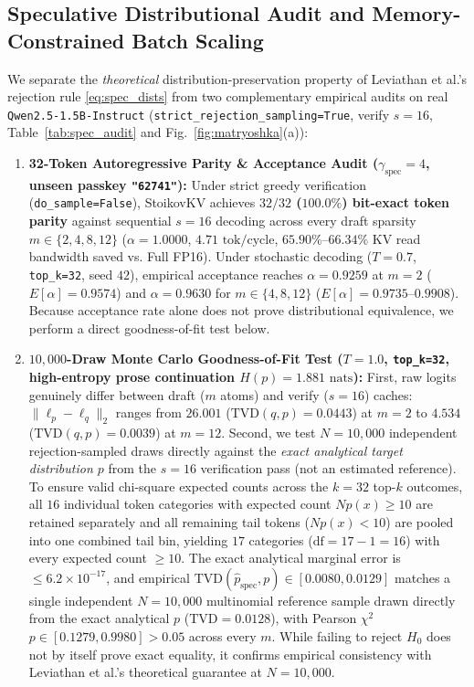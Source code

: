 \documentclass[conference]{IEEEtran}
\begin{document}
\subsection{Speculative Distributional Audit and Memory-Constrained Batch Scaling}
We separate the \emph{theoretical} distribution-preservation property of Leviathan et al.'s rejection rule \eqref{eq:spec_dists} from two complementary empirical audits on real \texttt{Qwen2.5-1.5B-Instruct} (\texttt{strict\_rejection\_sampling=True}, verify $s = 16$, Table~\ref{tab:spec_audit} and Fig.~\ref{fig:matryoshka}(a)):
\begin{enumerate}
    \item \textbf{32-Token Autoregressive Parity \& Acceptance Audit ($\gamma_{\text{spec}} = 4$, unseen passkey \texttt{"62741"}):} Under strict greedy verification (\texttt{do\_sample=False}), StoikovKV achieves \textbf{$32/32$ ($100.0\%$) bit-exact token parity} against sequential $s = 16$ decoding across every draft sparsity $m \in \{2, 4, 8, 12\}$ ($\alpha = 1.0000$, $4.71\text{ tok/cycle}$, $65.90\%$--$66.34\%$ KV read bandwidth saved vs. Full FP16). Under stochastic decoding ($T = 0.7$, \texttt{top\_k=32}, seed $42$), empirical acceptance reaches $\alpha = 0.9259$ at $m=2$ ($E[\alpha] = 0.9574$) and $\alpha = 0.9630$ for $m \in \{4, 8, 12\}$ ($E[\alpha] = 0.9735$--$0.9908$). Because acceptance rate alone does not prove distributional equivalence, we perform a direct goodness-of-fit test below.
    \item \textbf{$10{,}000$-Draw Monte Carlo Goodness-of-Fit Test ($T = 1.0$, \texttt{top\_k=32}, high-entropy prose continuation $H(p) = 1.881\text{ nats}$):} First, raw logits genuinely differ between draft ($m$ atoms) and verify ($s=16$) caches: $\|\ell_p - \ell_q\|_2$ ranges from $26.001$ ($\text{TVD}(q, p) = 0.0443$) at $m=2$ to $4.534$ ($\text{TVD}(q, p) = 0.0039$) at $m=12$. Second, we test $N = 10{,}000$ independent rejection-sampled draws directly against the \emph{exact analytical target distribution $p$} from the $s=16$ verification pass (not an estimated reference). To ensure valid chi-square expected counts across the $k = 32$ top-$k$ outcomes, all $16$ individual token categories with expected count $N p(x) \ge 10$ are retained separately and all remaining tail tokens ($N p(x) < 10$) are pooled into one combined tail bin, yielding $17$ categories ($\text{df} = 17 - 1 = 16$) with every expected count $\ge 10$. The exact analytical marginal error is $\le 6.2 \times 10^{-17}$, and empirical $\text{TVD}(\hat{p}_{\text{spec}}, p) \in [0.0080, 0.0129]$ matches a single independent $N = 10{,}000$ multinomial reference sample drawn directly from the exact analytical $p$ ($\text{TVD} = 0.0128$), with Pearson $\chi^2$ $p \in [0.1279, 0.9980] > 0.05$ across every $m$. While failing to reject $H_0$ does not by itself prove exact equality, it confirms empirical consistency with Leviathan et al.'s theoretical guarantee at $N = 10{,}000$.
\end{enumerate}
\end{document}
